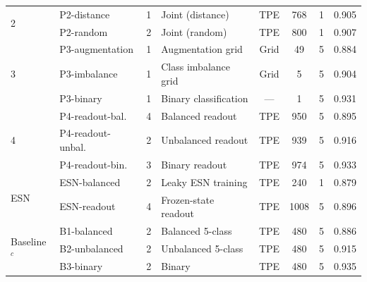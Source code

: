 \documentclass[journal=asbcd6,manuscript=suppinfo]{achemso}
\begin{document}
\begin{table}[H]
\begin{tabular}{llclcccc}
        \multirow{2}{*}{2}
        & P2-distance      & 1 & Joint (distance)      & TPE  & 768  & 1 & 0.905 \\
        & P2-random        & 2 & Joint (random)        & TPE  & 800  & 1 & 0.907 \\
        \midrule
        \multirow{3}{*}{3}
        & P3-augmentation  & 1 & Augmentation grid     & Grid & 49   & 5 & 0.884 \\
        & P3-imbalance     & 1 & Class imbalance grid  & Grid & 5    & 5 & 0.904 \\
        & P3-binary        & 1 & Binary classification & ---  & 1    & 5 & 0.931 \\
        \midrule
        \multirow{3}{*}{4}
        & P4-readout-bal.  & 4 & Balanced readout      & TPE  & 950  & 5 & 0.895 \\
        & P4-readout-unbal.& 2 & Unbalanced readout    & TPE  & 939  & 5 & 0.916 \\
        & P4-readout-bin.  & 3 & Binary readout        & TPE  & 974  & 5 & 0.933 \\
        \midrule
        \multirow{2}{*}{ESN}
        & ESN-balanced     & 2 & Leaky ESN training    & TPE  & 240  & 1 & 0.879 \\
        & ESN-readout      & 4 & Frozen-state readout  & TPE  & 1008 & 5 & 0.896 \\
        \midrule
        \multirow{3}{*}{Baseline$^{c}$}
        & B1-balanced      & 2 & Balanced 5-class      & TPE  & 480  & 5 & 0.886 \\
        & B2-unbalanced    & 2 & Unbalanced 5-class    & TPE  & 480  & 5 & 0.915 \\
        & B3-binary        & 2 & Binary                & TPE  & 480  & 5 & 0.935 \\
        \bottomrule
    \end{tabular}
    \vspace{0.4em}
\end{table}
\end{document}
